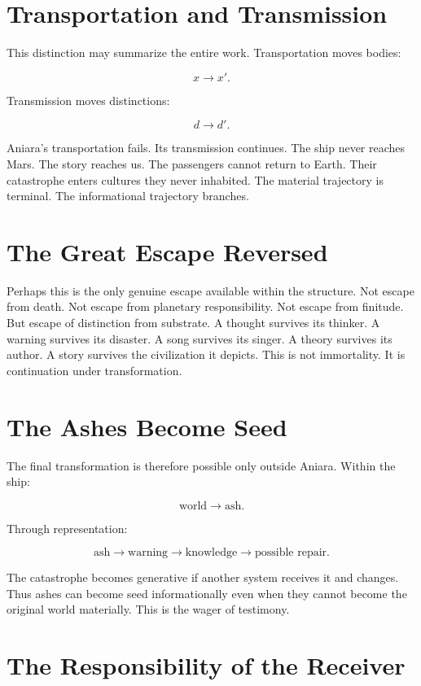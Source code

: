 \documentclass[11pt,oneside]{book}
\theoremstyle{definition}
\theoremstyle{remark}
\begin{document}
\section{Transportation and Transmission}

This distinction may summarize the entire work. Transportation moves bodies:

\[
x \rightarrow x'.
\]

Transmission moves distinctions:

\[
d \rightarrow d'.
\]

Aniara's transportation fails. Its transmission continues. The ship never reaches Mars. The story
reaches us. The passengers cannot return to Earth. Their catastrophe enters cultures they never
inhabited. The material trajectory is terminal. The informational trajectory branches.

\section{The Great Escape Reversed}

Perhaps this is the only genuine escape available within the structure. Not escape from death. Not
escape from planetary responsibility. Not escape from finitude. But escape of distinction from
substrate. A thought survives its thinker. A warning survives its disaster. A song survives its
singer. A theory survives its author. A story survives the civilization it depicts. This is not
immortality. It is continuation under transformation.

\section{The Ashes Become Seed}

The final transformation is therefore possible only outside Aniara. Within the ship:

\[
\text{world} \rightarrow \text{ash}.
\]

Through representation:

\[
\text{ash} \rightarrow \text{warning} \rightarrow \text{knowledge} \rightarrow \text{possible repair}.
\]

The catastrophe becomes generative if another system receives it and changes. Thus ashes can become
seed informationally even when they cannot become the original world materially. This is the wager
of testimony.

\section{The Responsibility of the Receiver}
\end{document}
